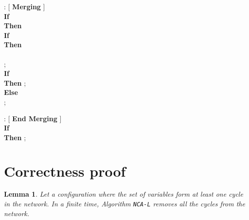 \documentclass[11pt,a4paper]{article}
\newtheorem{lemma}{Lemma}
\newcommand{\LabA}{\mbox{\tt NCA-L}}
\begin{document}
\begin{description}
\item : [ \textbf{Merging} ] \\
\textbf{If} \\
\textbf{Then}\\
\hspace*{0,5cm}\textbf{If } \\
\hspace*{0,5cm}\textbf{Then }\\
\hspace*{0,9cm} \\
\hspace*{0,9cm} ;\\
\hspace*{0,5cm}\textbf{If } \\
\hspace*{0,5cm}\textbf{Then } ;\\
\hspace*{0,5cm}\textbf{Else } \\
\hspace*{1,4cm} ;
\end{description}



\begin{description}
\item : [ \textbf{End Merging} ] \\
\textbf{If} \\
\textbf{Then} ;
\end{description}









\section{Correctness proof}

\begin{lemma}
\label{lem:no_cycle}
Let  a configuration where the set of variables
 form at least one cycle in the network. 
In a finite time, Algorithm \LabA\/ removes all the cycles from the network.
\end{lemma}
\end{document}
